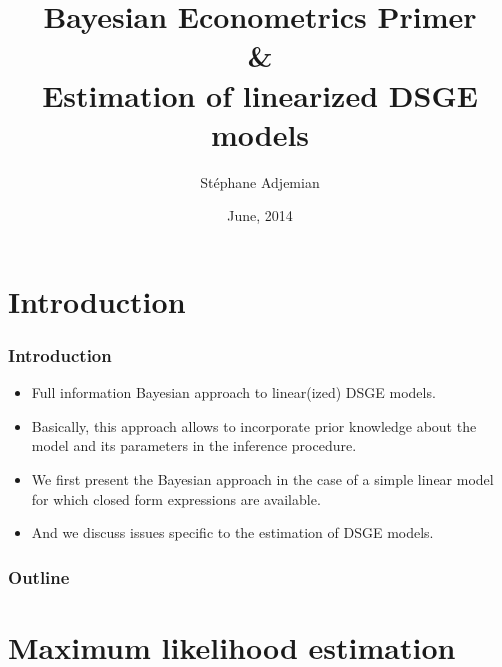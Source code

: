\documentclass[10pt,slidestop]{beamer}
\begin{document}
\title{Bayesian Econometrics Primer\\ \& \\ Estimation of linearized
  DSGE models}
\author[S. Adjemian]{St\'ephane Adjemian}
\date{June, 2014}

\begin{frame}
  \titlepage{}
\end{frame}

\section{Introduction}

\begin{frame}
  \frametitle{Introduction}
  \begin{itemize}
    \item Full information Bayesian approach to linear(ized) DSGE models.
    \item Basically, this approach allows to incorporate prior
      knowledge about the model and its parameters in the inference
      procedure.
    \item We first present the Bayesian approach in the case of a simple
      linear model for which closed form expressions are available.
    \item And we discuss issues specific to the estimation of DSGE models.
  \end{itemize}
\end{frame}


\begin{frame}
    \frametitle{Outline}
    \tableofcontents
  \end{frame}

\section{Maximum likelihood estimation}
\end{document}
